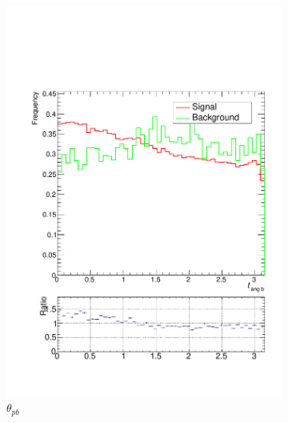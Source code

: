 \documentclass[10pt,a4paper]{book}
\begin{document}
\begin{figure}
\begin{subfigure}{.33\textwidth}
\includegraphics[scale=0.25]{reco/tang2}
\caption{$\theta_{pb}$}
\end{subfigure}
\begin{subfigure}{0.5\textwidth}
\centering

\end{subfigure}
\end{figure}
\end{document}
